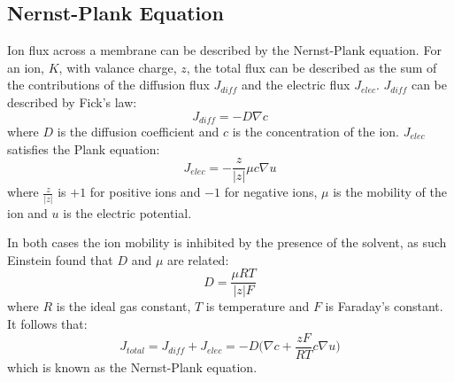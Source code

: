 \subsection{Nernst-Plank Equation}
\label{appendixNPE}
Ion flux across a membrane can be described by the Nernst-Plank equation. For an ion, $K$, with valance charge, $z$, the total flux can be described as the sum of the contributions of the diffusion flux $J_{diff}$ and the electric flux $J_{elec}$. $J_{diff}$ can be described by Fick's law:
\begin{equation}
    J_{diff} = -D\nabla c
\end{equation}
where $D$ is the diffusion coefficient and $c$ is the concentration of the ion. $J_{elec}$ satisfies the Plank equation:
\begin{equation}
    J_{elec} = -\frac{z}{|z|}\mu c\nabla u
\end{equation}
where $\frac{z}{|z|}$ is $+1$ for positive ions and $-1$ for negative ions, $\mu$ is the mobility of the ion and $u$ is the electric potential. \par

In both cases the ion mobility is inhibited by the presence of the solvent, as such Einstein \citep{einstien} found that $D$ and $\mu$ are related:
\begin{equation}
    D = \frac{\mu RT}{|z|F}
\end{equation}
where $R$ is the ideal gas constant, $T$ is temperature and $F$ is Faraday's constant. It follows that:
\begin{equation}
    J_{total} = J_{diff}+J_{elec} = -D\bigg(\nabla c + \frac{zF}{RT}c\nabla u\bigg)
    \label{nerstplankeq}
\end{equation}
which is known as the Nernst-Plank equation.

